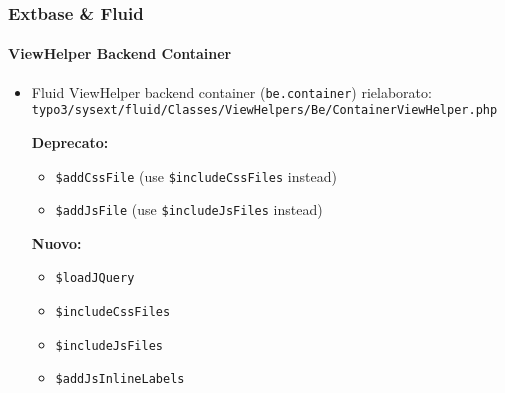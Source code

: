 \begin{frame}[fragile]
	\frametitle{Extbase \& Fluid}
	\framesubtitle{ViewHelper Backend Container}

	\lstset{
		basicstyle=\smaller\ttfamily
	}

	\begin{itemize}
		\item Fluid ViewHelper backend container (\texttt{be.container}) rielaborato:\newline
			\smaller\texttt{typo3/sysext/fluid/Classes/ViewHelpers/Be/ContainerViewHelper.php}\normalsize\newline

			\smaller\textbf{Deprecato:}\normalsize
			\begin{itemize}
				\item \texttt{\$addCssFile} (use \texttt{\$includeCssFiles} instead)
				\item \texttt{\$addJsFile} (use \texttt{\$includeJsFiles} instead)
			\end{itemize}

			\smaller\textbf{Nuovo:}\normalsize
			\begin{itemize}
				\item \texttt{\$loadJQuery}
				\item \texttt{\$includeCssFiles}
				\item \texttt{\$includeJsFiles}
				\item \texttt{\$addJsInlineLabels}
			\end{itemize}

	\end{itemize}

\end{frame}


